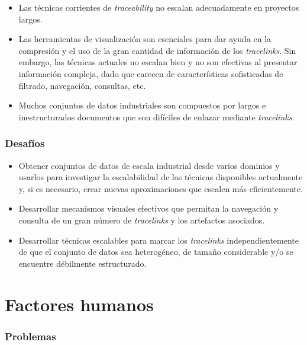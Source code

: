 \documentclass[a4paper,12pt,twoside,spanish,openright]{book}
\begin{document}
\begin{itemize}[label={$\times$}]

\item Las técnicas corrientes de \textit{traceability} no escalan adecuadamente en proyectos largos.

\item Las herramientas de visualización son esenciales para dar ayuda en la compresión y el uso de la gran cantidad de información de los \textit{tracelinks}. Sin embargo, las técnicas actuales no escalan bien y no son efectivas al presentar información compleja, dado que carecen de características sofisticadas de filtrado, navegación, consultas, etc.

\item Muchos conjuntos de datos industriales son compuestos por largos e inestructurados documentos que son difíciles de enlazar mediante \textit{tracelinks}.
\end{itemize}

\subsubsection{Desafíos}

\begin{itemize}[label={\checkmark}]

\item Obtener conjuntos de datos de escala industrial desde varios dominios y usarlos para investigar la escalabilidad de las técnicas disponibles actualmente y, si es necesario, crear nuevas aproximaciones que escalen más eficientemente.

\item Desarrollar mecanismos visuales efectivos que permitan la navegación y consulta de un gran número de \textit{tracelinks} y los artefactos asociados.

\item Desarrollar técnicas escalables para marcar los \textit{tracelinks} independientemente de que el conjunto de datos sea heterogéneo, de tamaño considerable y/o se encuentre débilmente estructurado.

\end{itemize}


\section{Factores humanos}

\subsubsection{Problemas}
\end{document}
